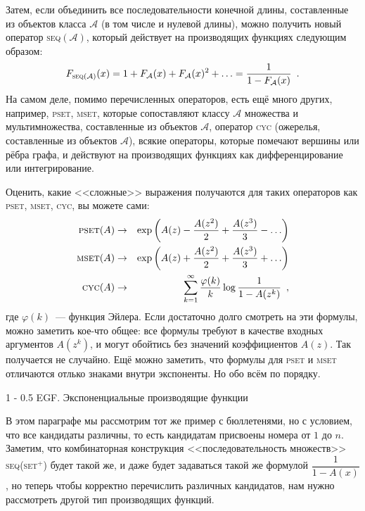 \documentclass[a5paper]{article}
\makeatletter
\theoremstyle{definition}
\renewcommand{\section}{\@startsection
{section}%
{1}%
{\z@}%
{-\baselineskip}%
{0.5\baselineskip}%
{\centering\large\scshape}} %
\makeatother
\begin{document}
Затем, если объединить все последовательности конечной длины, составленные из 
объектов класса \( \mathcal A \) (в том числе и 
нулевой длины), можно получить новый оператор \textsc{seq}\( (\mathcal A) \), 
который действует 
на производящих функциях следующим образом:
\[
	F_{\text{\textsc{seq}}(\mathcal A)} (x) = 1 + F_{\mathcal A}(x) + 
	F_{\mathcal A}(x)^2 + \ldots = 
	\dfrac{1}{1 - F_{\mathcal A}(x)} \enspace .
\]
На самом деле, помимо перечисленных операторов, есть ещё много других, 
например, \textsc{pset}, \textsc{mset}, которые сопоставляют классу \( \mathcal 
A \) множества и 
мультимножества, составленные из объектов \( \mathcal A \), оператор 
\textsc{cyc} (ожерелья, составленные из объектов \( \mathcal A \)), всякие 
операторы, которые 
помечают вершины или рёбра графа, и действуют на производящих функциях как 
дифференцирование или интегрирование.

Оценить, какие <<сложные>> выражения получаются для таких операторов как 
\textsc{pset}, \textsc{mset}, \textsc{cyc}, вы можете сами:
\begin{eqnarray*}
	\text{\textsc{pset}}(A) & \to & \exp \left(
		A(z) - \dfrac{A(z^2)}{2} + \dfrac{A(z^3)}{3} - \ldots
	\right)\\
	\text{\textsc{mset}}(A) & \to & \exp \left(
		A(z) + \dfrac{A(z^2)}{2} + \dfrac{A(z^3)}{3} + \ldots
	\right)\\
	\text{\textsc{cyc}}(A) & \to & 
	\sum_{k=1}^{\infty} \dfrac{\varphi(k)}{k} \log \dfrac{1}{1 - A(z^k)} 
	\enspace ,
\end{eqnarray*}
где \( \varphi(k) \)~--- функция Эйлера. Если достаточно долго смотреть на эти 
формулы, можно заметить кое-что общее: все формулы требуют в качестве входных 
аргументов \( A(z^k) \), и могут обойтись без значений коэффициентов \( A(z) 
\). Так получается не случайно. Ещё можно заметить, что формулы для 
\textsc{pset} и \textsc{mset} 
отличаются отлько знаками внутри экспоненты.
Но обо всём по порядку.

\section{EGF. Экспоненциальные производящие 
	функции}

В этом параграфе мы рассмотрим тот же пример с бюллетенями, но с условием, что 
все кандидаты 
различны, то 
есть кандидатам присвоены номера от \( 1 \) до \( n \). Заметим, что 
комбинаторная конструкция <<последовательность множеств>> 
\textsc{seq}(\textsc{set}\( ^{+} \)) будет такой же, и 
даже будет задаваться такой же формулой \( \dfrac{1}{1 - A(x)} \), но теперь 
чтобы корректно перечислить различных кандидатов, нам 
нужно рассмотреть другой тип производящих функций.
\end{document}
